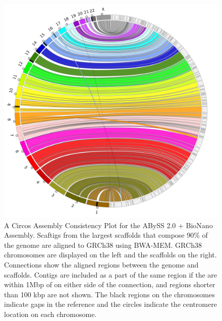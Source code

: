 \documentclass[
  12pt,
  oneside,
  openany]{book}
\begin{document}
\begin{appendices}
\begin{figure}
\hypertarget{fig:jup2}{%
\centering
\includegraphics{abyss2-appendix/abyss2_bionano.png}
\caption[A Circos Assembly Consistency Plot for the ABySS 2.0 + BioNano Assembly.]{A Circos Assembly Consistency Plot for the ABySS 2.0 + BioNano Assembly. Scaftigs from the largest scaffolds that compose 90\% of the genome are aligned to GRCh38 using BWA-MEM. GRCh38 chromosomes are displayed on the left and the scaffolds on the right. Connections show the aligned regions between the genome and scaffolds. Contigs are included as a part of the same region if the are within 1Mbp of on either side of the connection, and regions shorter than 100 kbp are not shown. The black regions on the chromosomes indicate gaps in the reference and the circles indicate the centromere location on each chromosome.}\label{fig:jup2}
}
\end{figure}


\end{appendices}
\end{document}
